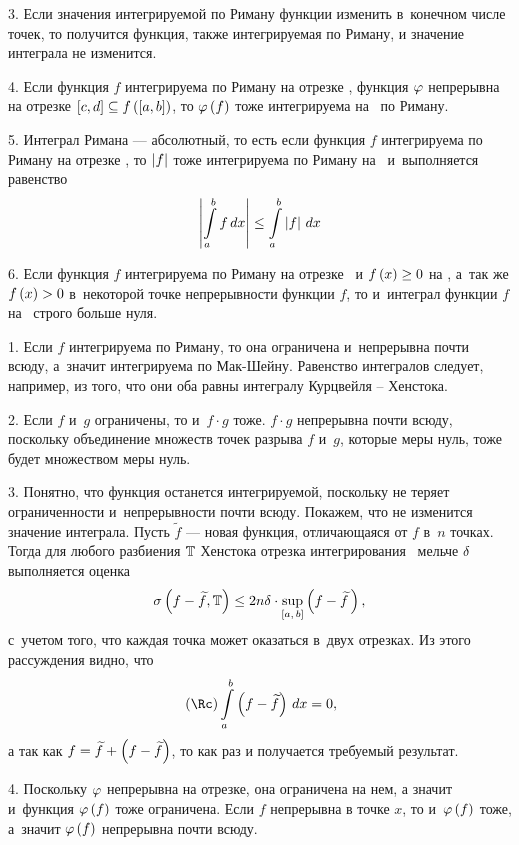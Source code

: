 \documentclass[draft]{article}
\begin{document}
\smallskip

3. Если значения интегрируемой по Риману функции изменить в~конечном
числе точек, то получится функция, также интегрируемая по Риману, и
значение интеграла не изменится.

\smallskip

4. Если функция $f$ интегрируема по Риману на отрезке \ab, функция
$\varphi$ непрерывна на отрезке $\seg[c,d]\subseteq f\at(\segab)$, то
$\ph\at(f)$ тоже интегрируема на \ab\ по Риману.

\smallskip

5. Интеграл Римана --- абсолютный, то есть если функция $f$
интегрируема по Риману на отрезке \ab, то $\left|f\right|$ тоже
интегрируема по Риману на \ab\ и~выполняется равенство
$$\abs\intabfdx\le\intab{\abs f},x$$

\smallskip

6. Если функция $f$ интегрируема по Риману на отрезке \ab\ и
$f\atx\ge0$ на \ab, а~так же $f\atx>0$ в~некоторой точке
непрерывности функции $f$, то и~интеграл функции $f$ на \ab\ строго
больше нуля.

\prs

\smallskip

1. Если $f$ интегрируема по Риману, то она ограничена и~непрерывна
почти всюду, а~значит интегрируема по Мак-Шейну. Равенство
интегралов следует, например, из того, что они оба равны интегралу
Курцвейля -- Хенстока.

\smallskip

2. Если $f$ и~$g$ ограничены, то и~$f \cdot g$ тоже. $f \cdot g$
непрерывна почти всюду, поскольку объединение множеств точек разрыва
$f$ и~$g$, которые меры нуль, тоже будет множеством меры нуль.

\smallskip

3. Понятно, что функция останется интегрируемой, поскольку не теряет
ограниченности и~непрерывности почти всюду. Покажем, что не
изменится значение интеграла. Пусть $\widetilde f$ --- новая
функция, отличающаяся от $f$ в~$n$ точках. Тогда для любого
разбиения $\mathbb{T}$ Хенстока отрезка интегрирования \ab\ мельче $\delta$
выполняется оценка $$\isum(f - \widetilde
f,\T)\le2n\de\cdot\sup\limits_{\seg[a,\,b]}\at(f - \widetilde
f\,),$$ с~учетом того, что каждая точка может оказаться в~двух
отрезках. Из этого рассуждения видно, что
$$\riman\intab{\at(f - \widetilde f)},x=0,$$
а так как $f=\widetilde f+\at(f - \widetilde f)$, то как раз и
получается требуемый результат.

\smallskip

4. Поскольку $\varphi$ непрерывна на отрезке, она ограничена на нем, а
значит и~функция $\ph\at(f)$ тоже ограничена. Если $f$ непрерывна в
точке $x$, то и~$\ph\at(f)$ тоже, а~значит $\ph\at(f)$ непрерывна
почти всюду.
\end{document}
